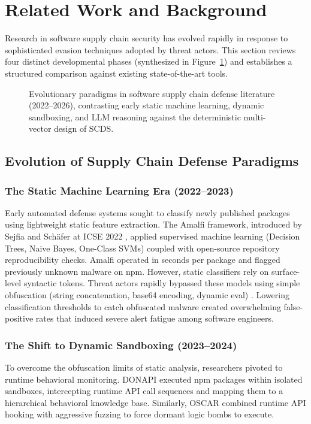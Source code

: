 \section{Related Work and Background}
\label{sec:related}

Research in software supply chain security has evolved rapidly in response to sophisticated evasion techniques adopted by threat actors. This section reviews four distinct developmental phases (synthesized in Figure~\ref{fig:evolution}) and establishes a structured comparison against existing state-of-the-art tools.

\begin{figure}[t]
\centering
\resizebox{0.95\textwidth}{!}{}
\caption{Evolutionary paradigms in software supply chain defense literature (2022--2026), contrasting early static machine learning, dynamic sandboxing, and LLM reasoning against the deterministic multi-vector design of SCDS.}
\label{fig:evolution}
\end{figure}

\subsection{Evolution of Supply Chain Defense Paradigms}

\subsubsection{The Static Machine Learning Era (2022--2023)}
Early automated defense systems sought to classify newly published packages using lightweight static feature extraction. The Amalfi framework, introduced by Sejfia and Sch{\"a}fer at ICSE 2022 \cite{sejfia2022amalfi}, applied supervised machine learning (Decision Trees, Naive Bayes, One-Class SVMs) coupled with open-source repository reproducibility checks. Amalfi operated in seconds per package and flagged previously unknown malware on npm. However, static classifiers rely on surface-level syntactic tokens. Threat actors rapidly bypassed these models using simple obfuscation (string concatenation, base64 encoding, dynamic eval) \cite{ladisa2023sok}. Lowering classification thresholds to catch obfuscated malware created overwhelming false-positive rates that induced severe alert fatigue among software engineers.

\subsubsection{The Shift to Dynamic Sandboxing (2023--2024)}
To overcome the obfuscation limits of static analysis, researchers pivoted to runtime behavioral monitoring. DONAPI \cite{huang2024donapi} executed npm packages within isolated sandboxes, intercepting runtime API call sequences and mapping them to a hierarchical behavioral knowledge base. Similarly, OSCAR \cite{duan2024oscar} combined runtime API hooking with aggressive fuzzing to force dormant logic bombs to execute. 

